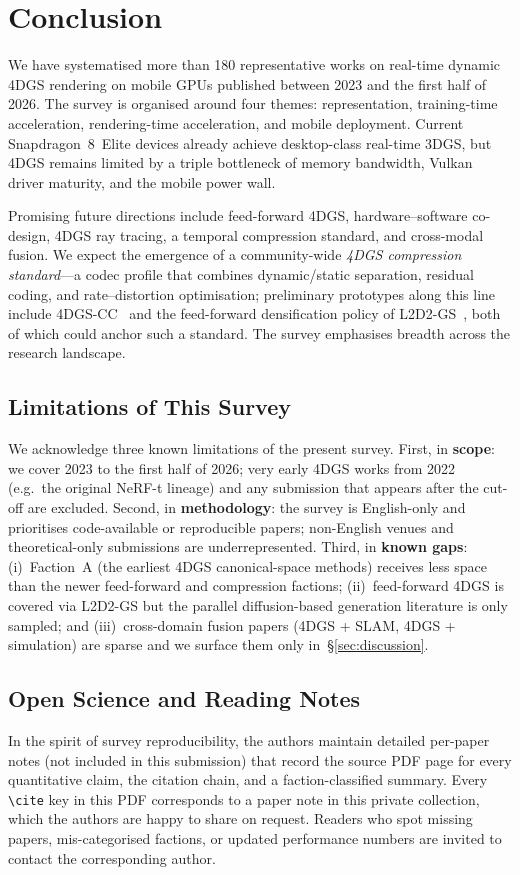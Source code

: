 
\section{Conclusion}
\label{sec:conclusion}

We have systematised more than 180 representative works on
real-time dynamic 4DGS rendering on mobile GPUs published between
2023 and the first half of 2026. The survey is organised around
four themes: representation, training-time acceleration,
rendering-time acceleration, and mobile deployment. Current
Snapdragon~8~Elite devices already achieve desktop-class real-time
3DGS, but 4DGS remains limited by a triple bottleneck of memory
bandwidth, Vulkan driver maturity, and the mobile power wall.

Promising future directions include feed-forward 4DGS,
hardware--software co-design, 4DGS ray tracing, a temporal
compression standard, and cross-modal fusion. We expect the
emergence of a community-wide \emph{4DGS compression standard}---a
codec profile that combines dynamic/static separation, residual
coding, and rate--distortion optimisation; preliminary prototypes
along this line include 4DGS-CC~\cite{chen20254dgscc} and the
feed-forward densification policy of
L2D2-GS~\cite{song2026l2d2gs}, both of which could anchor such a
standard. The survey emphasises breadth across the research
landscape.

\subsection{Limitations of This Survey}
We acknowledge three known limitations of the present survey.
First, in \textbf{scope}: we cover 2023 to the first half of
2026; very early 4DGS works from 2022 (e.g.\ the original NeRF-t
lineage) and any submission that appears after the cut-off are
excluded. Second, in \textbf{methodology}: the survey is
English-only and prioritises code-available or reproducible
papers; non-English venues and theoretical-only submissions are
underrepresented. Third, in \textbf{known gaps}: (i)~Faction~A
(the earliest 4DGS canonical-space methods) receives less space
than the newer feed-forward and compression factions;
(ii)~feed-forward 4DGS is covered via L2D2-GS but the parallel
diffusion-based generation literature is only sampled; and
(iii)~cross-domain fusion papers (4DGS + SLAM,
4DGS + simulation) are sparse and we surface them only
in~\S\ref{sec:discussion}.

\subsection{Open Science and Reading Notes}
In the spirit of survey reproducibility, the authors maintain
detailed per-paper notes (not included in this submission) that
record the source PDF page for every quantitative claim, the
citation chain, and a faction-classified summary. Every
\texttt{\textbackslash cite} key in this PDF corresponds to a
paper note in this private collection, which the authors are
happy to share on request. Readers who spot missing papers,
mis-categorised factions, or updated performance numbers are
invited to contact the corresponding author.

